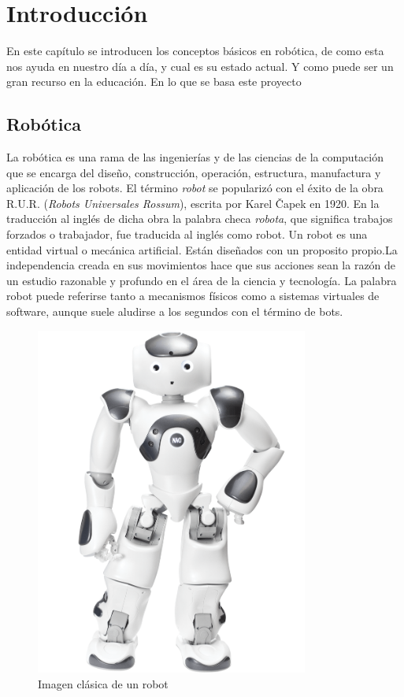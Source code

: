 \chapter{Introducción}
\label{chap:intro}
En este capítulo se introducen los conceptos básicos en robótica, de como esta nos ayuda en nuestro día a día, y cual es su estado actual. Y como puede ser un gran recurso en la educación. En lo que se basa este proyecto

\section{Robótica}
\label{sec:robotica}
La robótica es una rama de las ingenierías y de las ciencias de la computación que se encarga del diseño, construcción, operación, estructura, manufactura y aplicación de los robots.
El término \textit{robot} se popularizó con el éxito de la obra R.U.R. (\textit{Robots Universales Rossum}), escrita por Karel Čapek en 1920. En la traducción al inglés de dicha obra la palabra checa \textit{robota}, que significa trabajos forzados o trabajador, fue traducida al inglés como robot.
Un robot es una entidad virtual o mecánica artificial. Están diseñados con un proposito propio.La independencia creada en sus movimientos hace que sus acciones sean la razón de un estudio razonable y profundo en el área de la ciencia y tecnología. La palabra robot puede referirse tanto a mecanismos físicos como a sistemas virtuales de software, aunque suele aludirse a los segundos con el término de bots.

    \begin{figure}[H]
    \centering
    \includegraphics[width=0.8\textwidth]{img/robot.png}
    \caption{Imagen clásica de un robot} \label{fig:robot}
    \end{figure}

